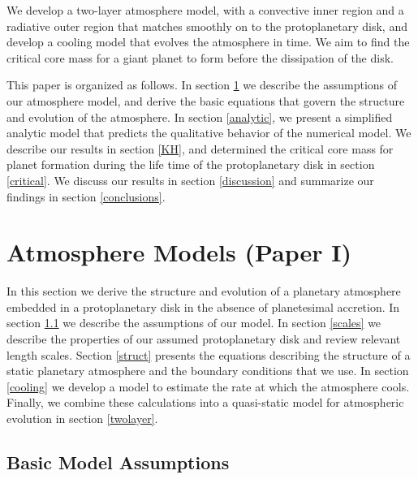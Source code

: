 \documentclass[apj]{emulateapj}
\begin{document}
We develop a two-layer atmosphere model, with a convective inner region and a radiative outer region that matches smoothly on to the protoplanetary disk, and develop a cooling model that evolves the atmosphere in time. We aim to find the critical core mass for a giant planet to form before the dissipation of the disk.

This paper is organized as follows. In section \ref{sec2} we describe the assumptions of our atmosphere model, and derive the basic equations that govern the structure and evolution of the atmosphere. In section \ref{analytic}, we present a simplified analytic model that predicts the qualitative behavior of the numerical model. We describe our results in section \ref{KH}, and determined the critical core mass for planet formation during the life time of the protoplanetary disk in section \ref{critical}.  We discuss our results in section \ref{discussion} and summarize our findings in section \ref{conclusions}.





\section{Atmosphere Models \textbf{(Paper I)}}
\label{sec2}

In this section we derive the structure and evolution of a planetary atmosphere embedded in a protoplanetary disk in the absence of planetesimal accretion. In section \ref{model} we describe the assumptions of our model. In section \ref{scales} we describe the properties of our assumed protoplanetary disk and review relevant length scales. Section \ref{struct} presents the equations describing the structure of a static planetary atmosphere and the boundary conditions that we use. In section \ref{cooling} we develop a model to estimate the rate at which the atmosphere cools. Finally, we combine these calculations into a quasi-static model for atmospheric evolution in section \ref{twolayer}.

\subsection{Basic Model Assumptions}
\label{model}
\end{document}
